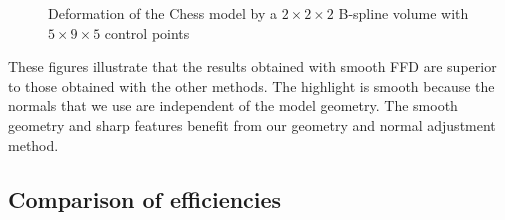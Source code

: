 \documentclass[3p]{elsarticle}
\begin{document}
\begin{figure}[htbp]
\begin{center}
\begin{minipage}[r]{0.35\textwidth}
		\caption{Deformation of the Chess model by a $2\times2\times2$ B-spline volume with $5\times9\times5$ control points}
		\label{fig:chess}
	\end{minipage}
\end{center}
\end{figure}

These figures illustrate that the results obtained with smooth FFD are superior to those obtained with the other
methods. The highlight is smooth because the normals that we use are independent of the model geometry. The smooth
geometry and sharp features benefit from our geometry and normal adjustment method.

\subsection{Comparison of efficiencies}
\end{document}
